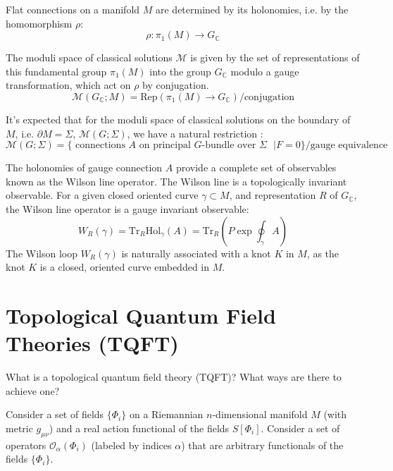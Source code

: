 \documentclass[a4paper,titlepage,twoside]{book}
\begin{document}
Flat connections on a manifold $M$ are determined by its holonomies, i.e. by the homomorphism $\rho$:
\begin{equation}
\rho : \pi_1(M) \to G_{\mathbb{C}}
\end{equation}

The moduli space of classical solutions $\mathcal{M}$ is given by the set of representations of this fundamental group $\pi_1{(M)}$ into the group $G_{\mathbb{C}}$ modulo a gauge transformation, which act on $\rho$ by conjugation.
\begin{equation}
  \mathcal{M}{ (G_{\mathbb{C}};M)} = \text{Rep}{ (\pi_1{ (M)} \to G_{\mathbb{C}}) }/ \text{conjugation}  \label{eq:CSLsubM00}
\end{equation}

It's expected that for the moduli space of classical solutions on the boundary of $M$, i.e. $\partial M = \Sigma$, $\mathcal{M}{ (G;\Sigma)}$, we have a natural restriction \cite{Atiyah1990}:
\begin{equation}
\mathcal{M}{ (G;\Sigma)} = \lbrace \text{ connections $A$ on principal $G$-bundle over $\Sigma$ } | F=0 \rbrace / \text{gauge equivalence} \label{eq:CSmodulispace00}
\end{equation}

The holonomies of gauge connection $A$ provide a complete set of observables known as the Wilson line operator. The Wilson line is a topologically invariant observable.  For a given closed oriented curve $\gamma \subset M$, and representation $R$ of $G_{\mathbb{C}}$, the Wilson line operator is a gauge invariant observable:
\begin{equation}
  W_R{ (\gamma) } = \text{Tr}_R{ \text{Hol}_{\gamma}{ (A)} } = \text{Tr}_R{ \left( P \exp{ \oint_{\gamma} A } \right) } \label{Eq:Wilsonline00}
\end{equation}
The Wilson loop $W_R{(\gamma)}$ is naturally associated with a knot $K$ in $M$, as the knot $K$ is a closed, oriented curve embedded in $M$.  



\section{Topological Quantum Field Theories (TQFT)}

What is a topological quantum field theory (TQFT)?  What ways are there to achieve one?

Consider a set of fields $\lbrace \Phi_i \rbrace$ on a Riemannian $n$-dimensional manifold $M$ (with metric $g_{\mu \nu}$) and a real action functional of the fields $S[\Phi_i]$.  Consider a set of operators $\mathcal{O}_{\alpha}(\Phi_i)$ (labeled by indices $\alpha$) that are arbitrary functionals of the fields $\lbrace \Phi_i \rbrace$.  
\end{document}
